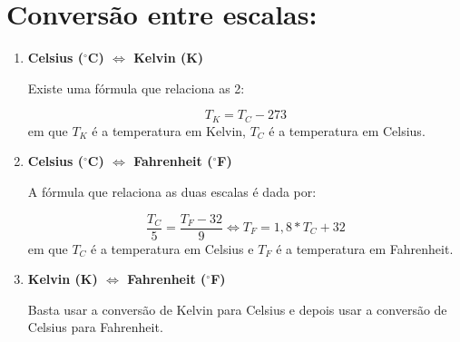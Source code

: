 \documentclass[12pt]{extarticle}
\newcommand{\<}{\langle}
\renewcommand{\>}{\rangle}
\newcommand{\grad}{$^\circ$}
\theoremstyle{definition}
\begin{document}
    \section{Conversão entre escalas:}
    
    \begin{enumerate}
        \item \textbf{Celsius (\grad C) $\Longleftrightarrow$ Kelvin (K)}
        
        Existe uma fórmula que relaciona as 2:
        
        \begin{equation}
            T_{K} = T_{C} - 273
        \end{equation}
        \noindent em que $T_K$ é a temperatura em Kelvin, $T_{C}$ é a temperatura em Celsius.
        
        \item\textbf{Celsius (\grad C) $\Longleftrightarrow$ Fahrenheit (\grad F)}
        
        A fórmula que relaciona as duas escalas é dada por:
        
        \begin{equation}
            \frac{T_C}{5} = \frac{T_F - 32}{9} \iff T_F = 1,8*T_C + 32 
        \end{equation}
        \noindent em que $T_C$ é a temperatura em Celsius e $T_F$ é a temperatura em Fahrenheit.
        
        \item \textbf{Kelvin (K) $\Longleftrightarrow$ Fahrenheit (\grad F)}
        
        Basta usar a conversão de Kelvin para Celsius e depois usar a conversão de Celsius para Fahrenheit.
    \end{enumerate}
\end{document}
